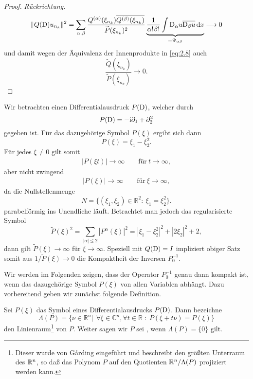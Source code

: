 \begin{proof} {\it Rückrichtung.}
\begin{equation}
\lVert Q(\mathrm D)u_{n_k}\rVert^2=\sum_{\alpha,\beta}\frac{Q^{(\alpha)}(\xi_{n_k}) \overline{Q^{(\beta)}(\xi_{n_k})}}{\widetilde{P}(\xi_{n_k})^2} \underbrace{\frac{1}{\alpha! \beta!}\int \mathrm D_\alpha u \overline{\mathrm D_\beta u} \,\mathrm d x}_{=\Psi_{\alpha \beta}} \longrightarrow 0
\end{equation}
und damit wegen der Äquivalenz der Innenprodukte in \eqref{eq:2.8} auch 
\begin{equation}
\frac{\widetilde{Q}(\xi_{n_k})}{\widetilde{P}(\xi_{n_k})} \longrightarrow 0.
\end{equation}
\end{proof}
\begin{exa}
Wir betrachten einen Differentialausdruck $P(\mathrm D)$, welcher durch
\begin{equation}
P(\mathrm D) = -\mathrm i\partial_1 + \partial_2^2
\end{equation}
gegeben ist. Für das dazugehörige Symbol $P(\xi)$ ergibt sich dann
\begin{equation}
P(\xi) = \xi_1 - \xi_2^2.
\end{equation}
Für jedes $\xi \not = 0$ gilt somit
\begin{align}
|P(\xi t)| \rightarrow \infty \qquad \text{für} \ t \rightarrow \infty,
\end{align}
aber nicht zwingend
\begin{align}
|P(\xi)| \rightarrow \infty \qquad \text{für} \ \xi \rightarrow \infty,
\end{align}
da die Nullstellenmenge
\begin{equation}
N= \{ (\xi_1,\xi_2)\in \mathbb{R}^2 : \ \xi_1 = \xi_2^2 \}.
\end{equation}
parabelförmig ins Unendliche läuft. Betrachtet man jedoch das regularisierte Symbol
\begin{equation}
\widetilde{P}(\xi)^2 = \sum_{|\alpha| \leq 2} |P^{\alpha}(\xi)|^2 = |\xi_1 - \xi_2^2|^2 + |2\xi_2|^2 + 2,
\end{equation}
dann gilt $\widetilde{P}(\xi) \rightarrow \infty$ für $\xi \rightarrow \infty$. Speziell mit $Q(\mathrm D)=I$ impliziert obiger Satz somit aus
$1/\widetilde P(\xi)\to0$ die Kompaktheit der Inversen $P_0^{-1}$.
\end{exa}
Wir werden im Folgenden zeigen, dass der Operator $P_0^{-1}$ genau dann kompakt ist, wenn das dazugehörige Symbol $P(\xi)$ von allen Variablen abhängt. Dazu vorbereitend geben wir zunächst folgende Definition.
\begin{df}
Sei $P(\xi)$ das Symbol eines Differentialausdrucks $P(\mathrm D)$. Dann bezeichne
\begin{equation}
\Lambda(P)=\{ \nu \in \mathbb{R}^n| \ \ \forall \xi \in \mathbb{C}^n, \forall t \in \mathbb{R} \;:\; P(\xi + t\nu) = P(\xi)  \}
\end{equation}
den Linienraum\footnote{Dieser wurde von G\r{a}rding eingeführt und beschreibt den größten Unterraum des $\mathbb R^n$, so daß das Polynom $P$ auf den Quotienten $\mathbb R^n/\Lambda(P)$ projiziert werden kann.} von $P$. Weiter sagen wir $P$ sei , wenn $\Lambda(P)=\{0\}$ gilt.
\end{df}
